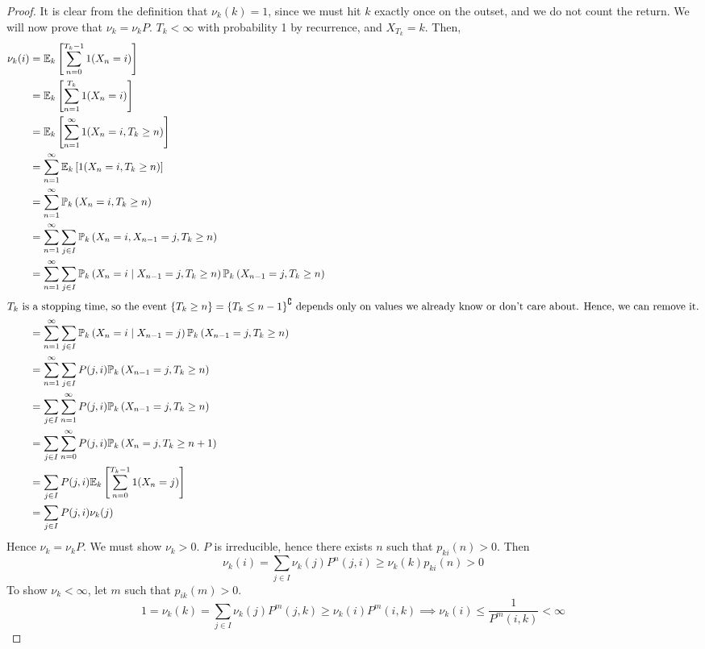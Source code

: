 \begin{proof}
	It is clear from the definition that \( \nu_k(k) = 1 \), since we must hit \( k \) exactly once on the outset, and we do not count the return.
	We will now prove that \( \nu_k = \nu_k P \).
	\( T_k < \infty \) with probability 1 by recurrence, and \( X_{T_k} = k \).
	Then,
	\begin{align*}
		\nu_k(i) & = \mathbb{E}_{k}\left[{\sum_{n=0}^{T_k - 1} 1(X_n = i)}\right]                                                                         \\
		         & = \mathbb{E}_{k}\left[{\sum_{n=1}^{T_k} 1(X_n = i)}\right]                                                                             \\
		         & = \mathbb{E}_{k}\left[{\sum_{n=1}^\infty 1(X_n = i, T_k \geq n)}\right]                                                                \\
		         & = \sum_{n=1}^\infty \mathbb{E}_{k}\left[{1(X_n = i, T_k \geq n)}\right]                                                                \\
		         & = \sum_{n=1}^\infty \mathbb{P}_{k}\left({X_n = i, T_k \geq n}\right)                                                                   \\
		         & = \sum_{n=1}^\infty \sum_{j \in I} \mathbb{P}_{k}\left({X_n = i, X_{n-1} = j, T_k \geq n}\right)                                       \\
		         & = \sum_{n=1}^\infty \sum_{j \in I} \mathbb{P}_{k}\left({X_n = i \mid X_{n-1} = j, T_k \geq n}\right) \mathbb{P}_{k}\left({X_{n-1} = j, T_k \geq n}\right) \\
		\intertext{\( T_k \) is a stopping time, so the event \( \qty{T_k \geq n} = \qty{T_k \leq n-1}^\complement \) depends only on values we already know or don't care about.
			Hence, we can remove it.}
		         & = \sum_{n=1}^\infty \sum_{j \in I} \mathbb{P}_{k}\left({X_n = i \mid X_{n-1} = j}\right) \mathbb{P}_{k}\left({X_{n-1} = j, T_k \geq n}\right)             \\
		         & = \sum_{n=1}^\infty \sum_{j \in I} P(j, i) \mathbb{P}_{k}\left({X_{n-1} = j, T_k \geq n}\right)                                        \\
		         & = \sum_{j \in I} \sum_{n=1}^\infty P(j, i) \mathbb{P}_{k}\left({X_{n-1} = j, T_k \geq n}\right)                                        \\
		         & = \sum_{j \in I} \sum_{n=0}^\infty P(j, i) \mathbb{P}_{k}\left({X_n = j, T_k \geq n + 1}\right)                                        \\
		         & = \sum_{j \in I} P(j, i) \mathbb{E}_{k}\left[{\sum_{n=0}^{T_k - 1} 1(X_n = j)}\right]                                                  \\
		         & = \sum_{j \in I} P(j, i) \nu_k(j)
	\end{align*}
	Hence \( \nu_k = \nu_k P \).
	We must show \( \nu_k > 0 \).
	\( P \) is irreducible, hence there exists \( n \) such that \( p_{ki}(n) > 0 \).
	Then
	\[
		\nu_k(i) = \sum_{j \in I} \nu_k(j) P^n(j,i) \geq \nu_k(k) p_{ki}(n) > 0
	\]
	To show \( \nu_k < \infty \), let \( m \) such that \( p_{ik}(m) > 0 \).
	\[
		1 = \nu_k(k) = \sum_{j \in I} \nu_k(j) P^m(j,k) \geq \nu_k(i) P^m(i,k) \implies \nu_k(i) \leq \frac{1}{P^m(i,k)} < \infty
	\]
\end{proof}
